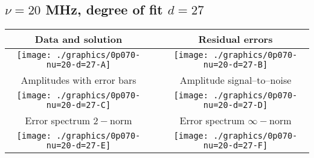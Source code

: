 

% 

\clearpage{}
\break{}

\subsection{$\nu = 20$ MHz, degree of fit $d = 27$}

\begin{table}[h]
    \begin{center}
        \begin{tabular}{ccc}
            Data and solution & \quad & Residual errors \\\hline
            \texttt{[image: ./graphics/0p070-nu=20-d=27-A]} &&
            \texttt{[image: ./graphics/0p070-nu=20-d=27-B]} \\[15pt]
            Amplitudes with error bars && Amplitude signal--to--noise \\\hline
            \texttt{[image: ./graphics/0p070-nu=20-d=27-C]} &&
            \texttt{[image: ./graphics/0p070-nu=20-d=27-D]} \\[15pt]
            Error spectrum $2-$norm && Error spectrum $\infty-$norm \\\hline
            \texttt{[image: ./graphics/0p070-nu=20-d=27-E]} &&
            \texttt{[image: ./graphics/0p070-nu=20-d=27-F]} \\[15pt]
        \end{tabular}
    \end{center}
\label{fig:elev=70, nu=20}
\end{table}



\endinput
